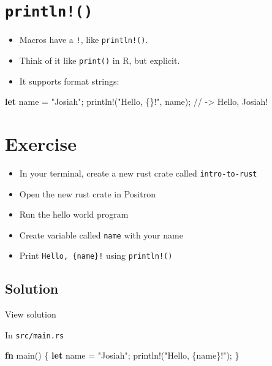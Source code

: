 \documentclass[
  letterpaper,
  DIV=11,
  numbers=noendperiod,
  oneside]{scrreprt}
\newenvironment{Shaded}{\begin{snugshade}}{\end{snugshade}}
\newcommand{\CommentTok}[1]{\textcolor[rgb]{0.37,0.37,0.37}{#1}}
\newcommand{\KeywordTok}[1]{\textcolor[rgb]{0.00,0.23,0.31}{\textbf{#1}}}
\newcommand{\NormalTok}[1]{\textcolor[rgb]{0.00,0.23,0.31}{#1}}
\newcommand{\OperatorTok}[1]{\textcolor[rgb]{0.37,0.37,0.37}{#1}}
\newcommand{\PreprocessorTok}[1]{\textcolor[rgb]{0.68,0.00,0.00}{#1}}
\newcommand{\StringTok}[1]{\textcolor[rgb]{0.13,0.47,0.30}{#1}}
\providecommand{\tightlist}{%
  \setlength{\itemsep}{0pt}\setlength{\parskip}{0pt}}\usepackage{longtable,booktabs,array}
\begin{document}
\section{\texorpdfstring{\texttt{println!()}}{println!()}}\label{println}

\begin{itemize}
\tightlist
\item
  Macros have a \texttt{!}, like \texttt{println!()}.
\item
  Think of it like \texttt{print()} in R, but explicit.
\item
  It supports format strings:
\end{itemize}

\begin{Shaded}
\begin{Highlighting}[]
\KeywordTok{let}\NormalTok{ name }\OperatorTok{=} \StringTok{"Josiah"}\OperatorTok{;}
\PreprocessorTok{println!}\NormalTok{(}\StringTok{"Hello, \{\}!"}\OperatorTok{,}\NormalTok{ name)}\OperatorTok{;}  \CommentTok{// {-}\textgreater{} Hello, Josiah!}
\end{Highlighting}
\end{Shaded}

\section{Exercise}\label{exercise}

\begin{itemize}
\tightlist
\item
  In your terminal, create a new rust crate called
  \texttt{intro-to-rust}
\item
  Open the new rust crate in Positron
\item
  Run the hello world program
\item
  Create variable called \texttt{name} with your name
\item
  Print \texttt{Hello,\ \{name\}!} using \texttt{println!()}
\end{itemize}

\subsection{Solution}\label{solution}

View solution

In \texttt{src/main.rs}

\begin{Shaded}
\begin{Highlighting}[]
\KeywordTok{fn}\NormalTok{ main() }\OperatorTok{\{}
    \KeywordTok{let}\NormalTok{ name }\OperatorTok{=} \StringTok{"Josiah"}\OperatorTok{;}
    \PreprocessorTok{println!}\NormalTok{(}\StringTok{"Hello, \{name\}!"}\NormalTok{)}\OperatorTok{;}
\OperatorTok{\}}
\end{Highlighting}
\end{Shaded}
\end{document}
